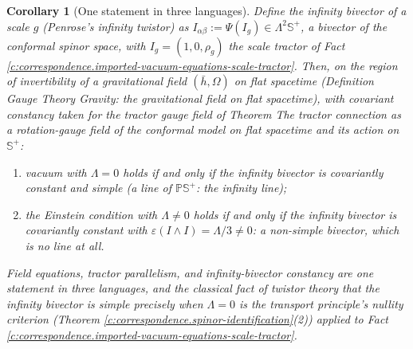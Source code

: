 \documentclass[11pt]{article}
\newtheorem{corollary}[theorem]{Corollary}
\theoremstyle{definition}
\theoremstyle{plain}
\newcommand{\changedmark}[2]{\marginpar{\raggedright\scriptsize\color{#1}#2}}
\providecommand{\CS}{}\renewcommand{\CS}{{\mathbb{S}^{+}}}
\providecommand{\PCS}{}\renewcommand{\PCS}{\mathbb{P}{\mathbb{S}^{+}}}
\providecommand{\hb}{}\renewcommand{\hb}{\bar{h}}
\begin{document}
\begin{corollary}[One statement in three languages]\label{c:correspondence.one-statement-three-languages}
\changedmark{gray}{reworded}
Define the \emph{infinity bivector} of a scale $g$ (Penrose's infinity twistor) as $I_{\alpha\beta} := \Psi(I_g) \in \Lambda^2\CS$, a bivector of the conformal spinor space, with $I_g = (1,0,\rho_g)$ the scale tractor of Fact \ref{c:correspondence.imported-vacuum-equations-scale-tractor}. Then, on the region of invertibility of a gravitational field $(\hb, \Omega)$ on flat spacetime (Definition \emph{Gauge Theory Gravity: the gravitational field on flat spacetime}), with covariant constancy taken for the tractor gauge field of Theorem \emph{The tractor connection as a rotation-gauge field of the conformal model on flat spacetime} and its action on $\CS$:
\begin{enumerate}
\item vacuum with $\Lambda = 0$ holds if and only if the infinity bivector is covariantly constant and \emph{simple} (a line of $\PCS$: the infinity line);
\item the Einstein condition with $\Lambda \neq 0$ holds if and only if the infinity bivector is covariantly constant with $\varepsilon(I\wedge I) = \Lambda/3 \neq 0$: a non-simple bivector, which is no line at all.
\end{enumerate}
Field equations, tractor parallelism, and infinity-bivector constancy are one statement in three languages, and the classical fact of twistor theory that the infinity bivector is simple precisely when $\Lambda = 0$ is the transport principle's nullity criterion (Theorem \ref{c:correspondence.spinor-identification}(2)) applied to Fact \ref{c:correspondence.imported-vacuum-equations-scale-tractor}.
\end{corollary}
\end{document}
